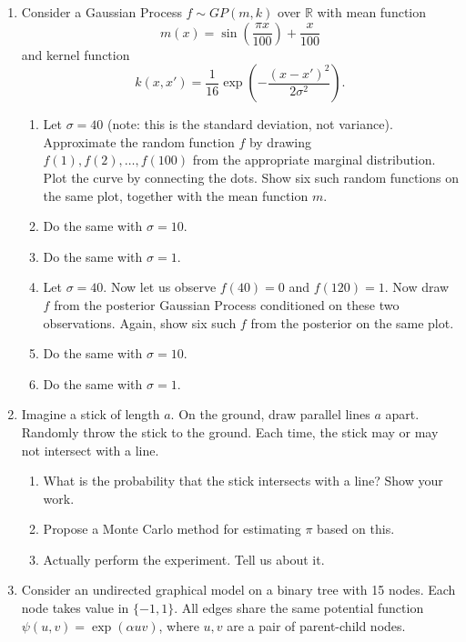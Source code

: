 \documentclass{article}
\def\R{\mathbb R}
\begin{document}
\begin{enumerate}
\begin{enumerate}
\color{black}

\end{enumerate}

\item 



Consider a Gaussian Process $f \sim GP(m,k)$ over $\R$ with mean function
$$m(x) = \sin(\frac{\pi x}{100}) + \frac{x}{100}$$
and kernel function
$$k(x,x') = \frac{1}{16}\exp\left( -\frac{(x-x')^2}{2\sigma^2} \right).$$
\begin{enumerate}
\item
Let $\sigma=40$ (note: this is the standard deviation, not variance).  Approximate the random function $f$ by drawing $f(1), f(2), \ldots, f(100)$ from the appropriate marginal distribution.  Plot the curve by connecting the dots.
Show six such random functions on the same plot, together with the mean function $m$.
\item Do the same with $\sigma=10$.
\item Do the same with $\sigma=1$.
\item
Let $\sigma=40$.
Now let us observe $f(40)=0$ and $f(120)=1$.
Now draw $f$ from the posterior Gaussian Process conditioned on these two observations.
Again, show six such $f$ from the posterior on the same plot.

\item Do the same with $\sigma=10$.
\item Do the same with $\sigma=1$.
\end{enumerate}


\item 
Imagine a stick of length $a$.  On the ground, draw parallel lines $a$ apart.
Randomly throw the stick to the ground.
Each time, the stick may or may not intersect with a line.
\begin{enumerate}
\item What is the probability that the stick intersects with a line?  Show your work.
\item Propose a Monte Carlo method for estimating $\pi$ based on this.  
\item Actually perform the experiment.  Tell us about it.
\end{enumerate}

\item 
Consider an undirected graphical model on a binary tree with 15 nodes.
Each node takes value in $\{-1,1\}$.
All edges share the same potential function $\psi(u,v) = \exp(\alpha u v)$, where $u,v$ are a pair of parent-child nodes.


\end{enumerate}
\end{document}
